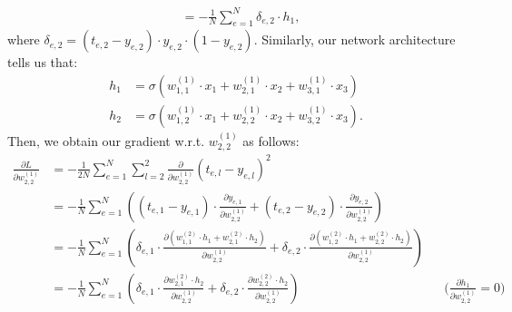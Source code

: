 \documentclass[11pt,a4paper]{article}
\begin{document}
\begin{enumerate}[label=(\alph*)]
\begin{enumerate}[label=(\roman*)]
\begin{align*}
                                                                  & = - \frac{1}{N} \sum_{e=1}^{N} \delta_{e,2} \cdot h_1,
                    \end{align*}
                    where $\delta_{e,2} = (t_{e,2}-y_{e,2})\cdot y_{e,2}\cdot\left(1-y_{e,2}\right).$
                    Similarly, our network architecture tells us that:
                    \begin{align*}
                        h_1 & = \sigma(w^{(1)}_{1,1}\cdot x_1 + w^{(1)}_{2,1}\cdot x_2 + w^{(1)}_{3,1}\cdot x_3)  \\
                        h_2 & = \sigma(w^{(1)}_{1,2}\cdot x_1 + w^{(1)}_{2,2}\cdot x_2 + w^{(1)}_{3,2}\cdot x_3).
                    \end{align*}
                    Then, we obtain our gradient w.r.t. $w_{2,2}^{(1)}$ as follows:
                    \begin{align*}
                        \frac{\partial L}{\partial w_{2,2}^{(1)}} & = - \frac{1}{2N} \sum_{e=1}^N \sum_{l=2}^2 \frac{\partial}{\partial w_{2,2}^{(1)}} \left(t_{e,l}-y_{e,l}\right)^2                                                                                                                                                                                                                      \\
                                                                  & = - \frac{1}{N} \sum_{e=1}^{N} \left( (t_{e,1}-y_{e,1})\cdot \frac{\partial y_{e,1}}{\partial w_{2,2}^{(1)}} + (t_{e,2}-y_{e,2}) \cdot \frac{\partial y_{e,2}}{\partial w_{2,2}^{(1)}}  \right)                                                                                                                                        \\
                                                                  & = - \frac{1}{N} \sum_{e=1}^{N} \left( \delta_{e,1}\cdot\frac{\partial(w^{(2)}_{1,1}\cdot h_1 + w^{(2)}_{2,1}\cdot h_2)}{\partial w_{2,2}^{(1)}} + \delta_{e,2}\cdot\frac{\partial(w^{(2)}_{1,2}\cdot h_1 + w^{(2)}_{2,2}\cdot h_2)}{\partial w_{2,2}^{(1)}}  \right)                                                                   \\
                                                                  & = - \frac{1}{N} \sum_{e=1}^{N} \left( \delta_{e,1}\cdot\frac{\partial w^{(2)}_{2,1}\cdot h_2}{\partial w_{2,2}^{(1)}} + \delta_{e,2}\cdot\frac{\partial w^{(2)}_{2,2}\cdot h_2}{\partial w_{2,2}^{(1)}}  \right)                                                     &  & \text{($\frac{\partial h_{1}}{\partial w_{2,2}^{(1)}} = 0$)} \\

\end{align*}
\end{enumerate}
\end{enumerate}
\end{document}
